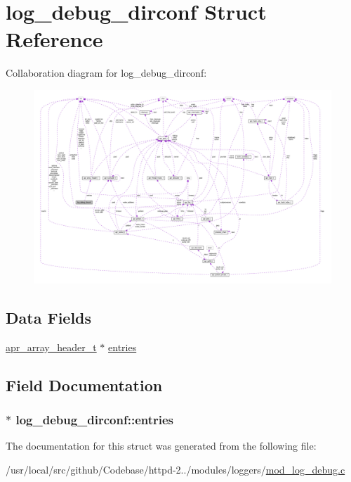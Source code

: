 \hypertarget{structlog__debug__dirconf}{}\section{log\+\_\+debug\+\_\+dirconf Struct Reference}
\label{structlog__debug__dirconf}


Collaboration diagram for log\+\_\+debug\+\_\+dirconf\+:
\nopagebreak
\begin{figure}[H]
\begin{center}
\leavevmode
\includegraphics[width=350pt]{structlog__debug__dirconf__coll__graph}
\end{center}
\end{figure}
\subsection*{Data Fields}
\begin{DoxyCompactItemize}
\item 
\hyperlink{structapr__array__header__t}{apr\+\_\+array\+\_\+header\+\_\+t} $\ast$ \hyperlink{structlog__debug__dirconf_a09648181b2c0665681e449a6e6b1d2fd}{entries}
\end{DoxyCompactItemize}


\subsection{Field Documentation}
\subsubsection[{\texorpdfstring{entries}{entries}}]{$\ast$ log\+\_\+debug\+\_\+dirconf\+::entries}\hypertarget{structlog__debug__dirconf_a09648181b2c0665681e449a6e6b1d2fd}{}\label{structlog__debug__dirconf_a09648181b2c0665681e449a6e6b1d2fd}


The documentation for this struct was generated from the following file\+:\begin{DoxyCompactItemize}
\item 
/usr/local/src/github/\+Codebase/httpd-\/2../modules/loggers/\hyperlink{mod__log__debug_8c}{mod\+\_\+log\+\_\+debug.\+c}\end{DoxyCompactItemize}
